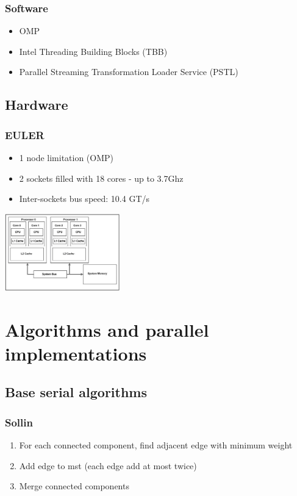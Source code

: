 \documentclass{beamer}
\begin{document}
\begin{frame}
\frametitle{Software}
\centering

\begin{itemize}
\item OMP
\item Intel Threading Building Blocks (TBB)
\item Parallel Streaming Transformation Loader Service (PSTL)
\end{itemize}

\end{frame}

\subsection{Hardware}

\begin{frame}
\frametitle{EULER}
\centering

\begin{itemize}
\item 1 node limitation (OMP)
\item 2 sockets filled with 18 cores - up to 3.7Ghz
\item Inter-sockets bus speed: 10.4 GT/s
\end{itemize}

\includegraphics[width=5cm]{dual_sockets_caches.png}
\end{frame}



\section{Algorithms and parallel implementations}

\subsection{Base serial algorithms}

\begin{frame}[fragile]
\frametitle{Sollin}
\begin{enumerate}
	\item For each connected component, find adjacent edge with minimum weight
	\item Add edge to mst (each edge add at most twice)
	\item Merge connected components
\end{enumerate}
\end{frame}
\end{document}
